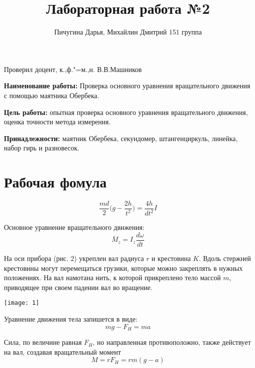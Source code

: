 \documentclass{article}
\begin{document}
\author{Пичугина Дарья, Михайлин Дмитрий 151 группа}
\title{Лабораторная работа №2}
\maketitle

\begin{flushright}
    Проверил доцент, к.,ф."=м.,н. \qquad\qquad  \qquad\qquad \qquad\qquad В.В.Машников
\end{flushright}

\textbf{Наименование работы:} Проверка основного уравнения 
вращательного движения с помощью маятника Обербека.

\textbf{Цель работы:} опытная проверка основного уравнения 
вращательного движения, оценка точности метода измерения.

\textbf{Принадлежности:} маятник Обербека, секундомер,
штангенциркуль, линейка, набор гирь и разновесок.

\section{Рабочая фомула}

\begin{equation}
    \frac{md}{2}\Big(g-\frac{2h}{t^2}\Big) = \frac{4h}{dt^2}I
\end{equation}
\vspace{1cm}

Основное уравнение вращательного движения: 
\begin{equation}
    \bar{M}_z=I_z\frac{d\omega}{dt} \nonumber
\end{equation}

На оси прибора (рис. 2) укреплен вал радиуса $r$ и крестовина
$K$. Вдоль стержней крестовины могут перемещаться грузики,
которые можно закреплять в нужных положениях. На вал намотана
нить, к которой прикреплено тело массой $m$, приводящее при
своем падении вал во вращение.

\texttt{[image: 1]}

Уравнение движения тела запишется в виде:
\begin{equation}
    mg - F_H = ma \nonumber
\end{equation}

Сила, по величине равная $F_H$, но направленная противоположно,
также действует на вал, создавая вращательный момент
\begin{equation}
    M = rF_H = rm(g-a) \nonumber
\end{equation}
\end{document}
